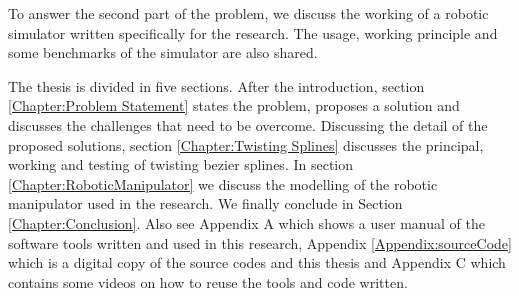 {    To answer the second part of the problem, we discuss the working of a robotic simulator written specifically for the research. The usage, working principle and some benchmarks of the simulator are also shared.

    The thesis is divided in five sections. After the introduction, section \ref{Chapter:Problem Statement} states the problem, proposes a solution and discusses the challenges that need to be overcome. Discussing the detail of the proposed solutions, section \ref{Chapter:Twisting Splines} discusses the principal, working and testing of twisting bezier splines. In section \ref{Chapter:RoboticManipulator} we discuss the modelling of the robotic manipulator used in the research. %
    We finally conclude in Section \ref{Chapter:Conclusion}. Also see Appendix A which shows a user manual of the software tools written and used in this research, Appendix \ref{Appendix:sourceCode} which is a digital copy of the source codes and this thesis and Appendix C which contains some videos on how to reuse the tools and code written.
} 